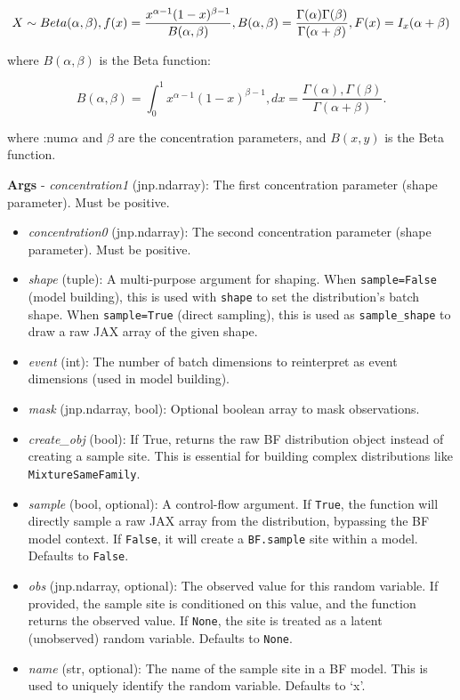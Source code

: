 \documentclass[
  letterpaper,
  DIV=11,
  numbers=noendperiod]{scrartcl}
\begin{document}
\[
X \sim Beta(\alpha,\beta), \\f(x)=\frac{ x^{\alpha-1}(1-x)^{\beta-1}}{B(\alpha,\beta)}, \\
B(\alpha,\beta)=\frac{\Gamma(\alpha)\Gamma(\beta)}{\Gamma(\alpha+\beta)}, \\F(x)=I_{x}(\alpha+\beta)
\]

where \(B(\alpha, \beta)\) is the Beta function:

\[
B(\alpha, \beta) = \int_0^1 x^{\alpha - 1} (1 - x)^{\beta - 1} , dx = \frac{\Gamma(\alpha),\Gamma (\beta)}{\Gamma(\alpha + \beta)}.
\]

where :num\(\alpha\) and \(\beta\) are the concentration parameters, and
\(B(x, y)\) is the Beta function.

\textbf{Args} - \emph{concentration1} (jnp.ndarray): The first
concentration parameter (shape parameter). Must be positive.

\begin{itemize}
\item
  \emph{concentration0} (jnp.ndarray): The second concentration
  parameter (shape parameter). Must be positive.
\item
  \emph{shape} (tuple): A multi-purpose argument for shaping. When
  \texttt{sample=False} (model building), this is used with
  \texttt{shape} to set the distribution's batch shape. When
  \texttt{sample=True} (direct sampling), this is used as
  \texttt{sample\_shape} to draw a raw JAX array of the given shape.
\item
  \emph{event} (int): The number of batch dimensions to reinterpret as
  event dimensions (used in model building).
\item
  \emph{mask} (jnp.ndarray, bool): Optional boolean array to mask
  observations.
\item
  \emph{create\_obj} (bool): If True, returns the raw BF distribution
  object instead of creating a sample site. This is essential for
  building complex distributions like \texttt{MixtureSameFamily}.
\item
  \emph{sample} (bool, optional): A control-flow argument. If
  \texttt{True}, the function will directly sample a raw JAX array from
  the distribution, bypassing the BF model context. If \texttt{False},
  it will create a \texttt{BF.sample} site within a model. Defaults to
  \texttt{False}.
\item
  \emph{obs} (jnp.ndarray, optional): The observed value for this random
  variable. If provided, the sample site is conditioned on this value,
  and the function returns the observed value. If \texttt{None}, the
  site is treated as a latent (unobserved) random variable. Defaults to
  \texttt{None}.
\item
  \emph{name} (str, optional): The name of the sample site in a BF
  model. This is used to uniquely identify the random variable. Defaults
  to `x'.
\end{itemize}
\end{document}
